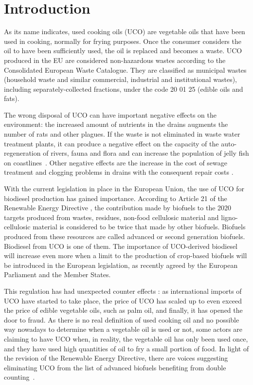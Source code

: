 \documentclass[sustainability,article,accept,moreauthors,pdftex,12pt,a4paper]{mdpi}
\begin{document}

\vspace{-12pt}
\section{Introduction}

As its name indicates, used cooking oils (UCO) are vegetable oils that have been used in cooking, normally for frying purposes. Once the consumer considers the oil to have been sufficiently used, the oil is replaced and becomes a waste. UCO produced in the EU are considered non-hazardous wastes according to the Consolidated European Waste Catalogue. They are classified as municipal wastes (household waste and similar commercial, industrial and institutional wastes), including separately-collected fractions, under the code 20 01 25 (edible oils and fats).

The wrong disposal of UCO can have important negative effects on the environment: the increased amount of nutrients in the drains augments the number of rats and other plagues. If the waste is not eliminated in waste water treatment plants, it can produce a negative effect on the capacity of the auto-regeneration of rivers, fauna and flora and can increase the population of jelly fish on coastlines~\cite{LifeECOBUS}. Other negative effects are the increase in the cost of sewage treatment and clogging problems in drains with the consequent repair costs \cite{LifeECOBUS}.

With the current legislation in place in the European Union, the use of UCO for biodiesel production has gained importance. According to Article 21 of the Renewable Energy Directive \cite{Directive2009/28/EC}, the contribution made by biofuels to the 2020 targets produced from wastes, residues, non-food cellulosic material and ligno-cellulosic material is considered to be twice that made by other biofuels. Biofuels produced from these resources are called advanced or second generation biofuels. Biodiesel from UCO is one of them. The importance of UCO-derived biodiesel will increase even more when a limit to the production of crop-based biofuels will be introduced in the European legislation, as recently agreed by the European Parliament and the Member States.

This regulation has had unexpected counter effects \cite{Bailey2013,ePURE2013,EBTP2011}: as international imports of UCO have started to take place, the price of UCO has scaled up to even exceed the price of edible vegetable oils, such as palm oil, and finally, it has opened the door to fraud. As there is no real definition of used cooking oil and no possible way nowadays to determine when a vegetable oil is used or not, some actors are claiming to have UCO when, in reality, the vegetable oil has only been used once, and they have used high quantities of oil to fry a small portion of food. In light of the revision of the Renewable Energy Directive, there are voices suggesting eliminating UCO from the list of advanced biofuels benefiting from double \mbox{counting \cite{ePURE2013}.}
\end{document}
